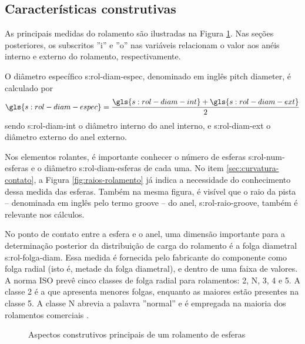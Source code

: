 \documentclass[12pt,oneside,english,brazil,lmodern,siglas,simbolos,cite=num]{ucsmonograph}
\begin{document}
	\subsection{Características construtivas}
	As principais medidas do rolamento são ilustradas na Figura \ref{fig:rolamento-medidas}.
	Nas seções posteriores, os subscritos ''i'' e ''o'' nas variáveis relacionam o valor aos anéis interno e externo do rolamento, respectivamente.
	
	O diâmetro específico \gls{s:rol-diam-espec}, denominado em inglês \foreignlanguage{english}{pitch diameter}, é calculado por
	\begin{equation} \label{eqn:rol:diam-espec}
		\gls{s:rol-diam-espec} = \frac{\gls{s:rol-diam-int} + 
		\gls{s:rol-diam-ext}}{2}
	\end{equation}
	sendo \gls{s:rol-diam-int} o diâmetro interno do anel interno, e \gls{s:rol-diam-ext} o diâmetro externo do anel externo.
	
	Nos elementos rolantes, é importante conhecer o número de esferas \gls{s:rol-num-esferas} e o diâmetro \gls{s:rol-diam-esferas} de cada uma.
	No item \ref{sec:curvatura-contato}, a Figura \ref{fig:raios-rolamento} já indica a necessidade do conhecimento dessa medida das esferas.	
	Também na mesma figura, é visível que o raio da pista -- denominada em inglês pelo termo \foreignlanguage{english}{groove} -- do anel, \gls{s:rol-raio-groove}, também é relevante nos cálculos.
	
	No ponto de contato entre a esfera e o anel, uma dimensão importante para a determinação posterior da distribuição de carga do rolamento é a folga diametral \gls{s:rol-folga-diam}.
	Essa medida é fornecida pelo fabricante do componente como folga radial (isto é, metade da folga diametral), e dentro de uma faixa de valores.
	A norma ISO prevê cinco classes de folga radial para rolamentos: 2, N, 3, 4 e 5. A classe 2 é a que apresenta menores folgas, enquanto as maiores estão presentes na classe 5.
	A classe N abrevia a palavra ''normal'' e é empregada na maioria dos rolamentos comerciais \cite{skfClearance}.
		
	\begin{figure}[t]
		\caption{Aspectos construtivos principais de um rolamento de esferas}
		\label{fig:rolamento-medidas}
	\end{figure}
\end{document}
